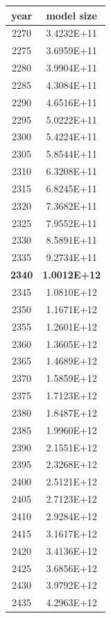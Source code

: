 \documentclass[a4paper]{article}
\begin{document}
    \begin{tabular}{| c | c |}
    	\hline
    	year & model size \\\hline
    	2270 & 3.4232E+11 \\\hline
    	2275 & 3.6959E+11 \\\hline
    	2280 & 3.9904E+11 \\\hline
    	2285 & 4.3084E+11 \\\hline
    	2290 & 4.6516E+11 \\\hline
    	2295 & 5.0222E+11 \\\hline
    	2300 & 5.4224E+11 \\\hline
    	2305 & 5.8544E+11 \\\hline
    	2310 & 6.3208E+11 \\\hline
    	2315 & 6.8245E+11 \\\hline
    	2320 & 7.3682E+11 \\\hline
    	2325 & 7.9552E+11 \\\hline
    	2330 & 8.5891E+11 \\\hline
    	2335 & 9.2734E+11 \\\hline
    	\textbf{2340} & \textbf{1.0012E+12} \\\hline
    	2345 & 1.0810E+12 \\\hline
    	2350 & 1.1671E+12 \\\hline
    	2355 & 1.2601E+12 \\\hline
    	2360 & 1.3605E+12 \\\hline
    	2365 & 1.4689E+12 \\\hline
    	2370 & 1.5859E+12 \\\hline
    	2375 & 1.7123E+12 \\\hline
    	2380 & 1.8487E+12 \\\hline
    	2385 & 1.9960E+12 \\\hline
    	2390 & 2.1551E+12 \\\hline
    	2395 & 2.3268E+12 \\\hline
    	2400 & 2.5121E+12 \\\hline
    	2405 & 2.7123E+12 \\\hline
    	2410 & 2.9284E+12 \\\hline
    	2415 & 3.1617E+12 \\\hline
    	2420 & 3.4136E+12 \\\hline
    	2425 & 3.6856E+12 \\\hline
    	2430 & 3.9792E+12 \\\hline
    	2435 & 4.2963E+12 \\\hline

\end{tabular}
\end{document}
